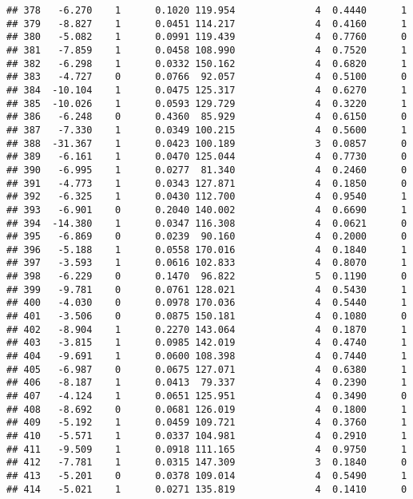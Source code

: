 \documentclass[
]{article}
\begin{document}
\begin{verbatim}
## 378   -6.270    1      0.1020 119.954              4  0.4440      1
## 379   -8.827    1      0.0451 114.217              4  0.4160      1
## 380   -5.082    1      0.0991 119.439              4  0.7760      0
## 381   -7.859    1      0.0458 108.990              4  0.7520      1
## 382   -6.298    1      0.0332 150.162              4  0.6820      1
## 383   -4.727    0      0.0766  92.057              4  0.5100      0
## 384  -10.104    1      0.0475 125.317              4  0.6270      1
## 385  -10.026    1      0.0593 129.729              4  0.3220      1
## 386   -6.248    0      0.4360  85.929              4  0.6150      0
## 387   -7.330    1      0.0349 100.215              4  0.5600      1
## 388  -31.367    1      0.0423 100.189              3  0.0857      0
## 389   -6.161    1      0.0470 125.044              4  0.7730      0
## 390   -6.995    1      0.0277  81.340              4  0.2460      0
## 391   -4.773    1      0.0343 127.871              4  0.1850      0
## 392   -6.325    1      0.0430 112.700              4  0.9540      1
## 393   -6.901    0      0.2040 140.002              4  0.6690      1
## 394  -14.380    1      0.0347 116.308              4  0.0621      0
## 395   -6.869    0      0.0239  90.160              4  0.2000      0
## 396   -5.188    1      0.0558 170.016              4  0.1840      1
## 397   -3.593    1      0.0616 102.833              4  0.8070      1
## 398   -6.229    0      0.1470  96.822              5  0.1190      0
## 399   -9.781    0      0.0761 128.021              4  0.5430      1
## 400   -4.030    0      0.0978 170.036              4  0.5440      1
## 401   -3.506    0      0.0875 150.181              4  0.1080      0
## 402   -8.904    1      0.2270 143.064              4  0.1870      1
## 403   -3.815    1      0.0985 142.019              4  0.4740      1
## 404   -9.691    1      0.0600 108.398              4  0.7440      1
## 405   -6.987    0      0.0675 127.071              4  0.6380      1
## 406   -8.187    1      0.0413  79.337              4  0.2390      1
## 407   -4.124    1      0.0651 125.951              4  0.3490      0
## 408   -8.692    0      0.0681 126.019              4  0.1800      1
## 409   -5.192    1      0.0459 109.721              4  0.3760      1
## 410   -5.571    1      0.0337 104.981              4  0.2910      1
## 411   -9.509    1      0.0918 111.165              4  0.9750      1
## 412   -7.781    1      0.0315 147.309              3  0.1840      0
## 413   -5.201    0      0.0378 109.014              4  0.5490      1
## 414   -5.021    1      0.0271 135.819              4  0.1410      0

\end{verbatim}
\end{document}
